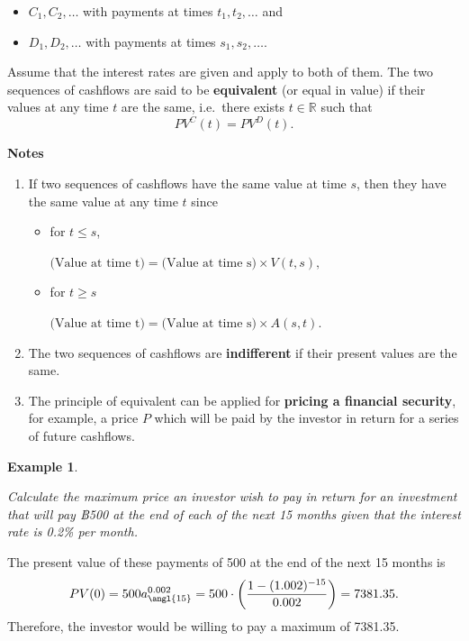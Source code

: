 \documentclass[
]{book}
\theoremstyle{definition}
\theoremstyle{definition}
\newtheorem{example}{Example}[chapter]
\theoremstyle{definition}
\theoremstyle{definition}
\theoremstyle{remark}
\begin{document}
\begin{itemize}
\item
  \(C_1, C_2, \ldots\) with payments at times \(t_1, t_2, \ldots\) and
\item
  \(D_1, D_2, \ldots\) with payments at times \(s_1, s_2, \ldots\).
\end{itemize}

Assume that the interest rates are given and apply to both of them. The
two sequences of cashflows are said to be \textbf{equivalent} (or equal in
value) if their values at any time \(t\) are the same, i.e.~there exists
\(t \in \mathbb{R}\) such that \[PV^C(t)  = PV^D(t).\]

\textbf{Notes}

\begin{enumerate}
\def\labelenumi{\arabic{enumi}.}
\item
  If two sequences of cashflows have the same value at time \(s\), then
  they have the same value at any time \(t\) since

  \begin{itemize}
  \item
    for \(t \le s\),

    \(\text{(Value at time t)} = \text{(Value at time s)} \times V(t,s),\)
  \item
    for \(t \ge s\)

    \(\text{(Value at time t)} = \text{(Value at time s)} \times A(s,t).\)
  \end{itemize}
\item
  The two sequences of cashflows are \textbf{indifferent} if their present
  values are the same.
\item
  The principle of equivalent can be applied for \textbf{pricing a financial
  security}, for example, a price \(P\) which will be paid by the
  investor in return for a series of future cashflows.
\end{enumerate}

\begin{example}
\protect\hypertarget{exm:unlabeled-div-44}{}\label{exm:unlabeled-div-44}

\emph{Calculate the maximum price an investor wish to pay in return for an
investment that will pay ฿500 at the end of each of the next 15 months
given that the interest rate is 0.2\% per month.}

\end{example}

The present value of these payments of 500 at the end of the next 15
months is
\[PV(0) = 500 a^{0.002}_{\angl{15}} =  500 \cdot \left(  \frac{1 - (1.002)^{-15}}{0.002}  \right)   = 7381.35.\]
Therefore, the investor would be willing to pay a maximum of 7381.35.
\end{document}
